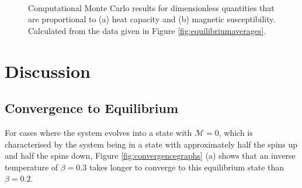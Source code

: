 \documentclass[11pt]{iopart}
\begin{document}
\begin{figure}[b]
    \centering
    \quad
     \
 
    \caption{Computational Monte Carlo results for dimensionless quantities that are proportional to (a) heat capacity and (b) magnetic susceptibility. Calculated from the data given in Figure \ref{fig:equilibriumaverages}.}
    \label{fig:derivedproperties}
\end{figure}

\section{Discussion}
\subsection{Convergence to Equilibrium}
For cases where the system evolves into a state with $\mathcal{M} = 0$, which is characterised by the system being in a state with approximately half the spins up and half the spins down, Figure \ref{fig:convergencegraphs} (a) shows that an inverse temperature of $\beta = 0.3$ takes longer to converge to this equilibrium state than $\beta = 0.2$.
\end{document}

